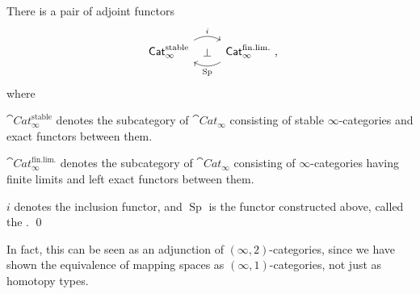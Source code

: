 \begin{theorem}
    There is a pair of adjoint functors 
    \[\begin{tikzcd}
        \cat{Cat}_{\infty}^{\mathrm{stable}}
        \ar[r,bend left,start anchor=north east,end anchor=north west,"i"]
        \ar[r,phantom,"\bot"] &
        \cat{Cat}_{\infty}^{\mathrm{fin.lim.}}\rlap{\ ,}
        \ar[l,bend left,start anchor=south west,end anchor=south east,"\operatorname{Sp}"]
    \end{tikzcd}\]
    where
    \begin{itms}
        \item $\cat{Cat}_{\infty}^{\mathrm{stable}}$
        denotes the subcategory of $\cat{Cat}_\infty$
        consisting of stable $\infty$-categories and exact functors between them.
        \item $\cat{Cat}_{\infty}^{\mathrm{fin.lim.}}$
        denotes the subcategory of $\cat{Cat}_\infty$
        consisting of $\infty$-categories having finite limits
        and left exact functors between them.
        \item $i$ denotes the inclusion functor,
        and $\operatorname{Sp}$ is the functor constructed above,
        called the . \qed
    \end{itms}
\end{theorem}

In fact, this can be seen as an adjunction of $(\infty,2)$-categories,
since we have shown the equivalence of mapping spaces as $(\infty,1)$-categories,
not just as homotopy types.
